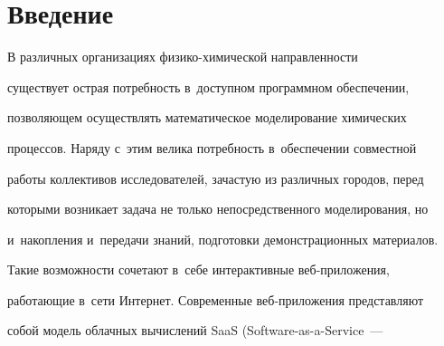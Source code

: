   























      \thispagestyle{headings}


      


      \vspace*{-18pt}





  \section{Введение}





  В различных организациях фи\-зи\-ко-хи\-ми\-че\-ской направленности 


существует острая потребность в~доступном программном обеспечении, 


позволяющем осуществлять математическое моделирование химических 


процессов. Наряду с~этим велика потребность в~обеспечении совместной 


работы коллективов исследователей, зачастую из различных городов, перед 


которыми возникает задача не только непосредственного моделирования, но 


и~накопления и~передачи знаний, подготовки демонстрационных материалов. 


Такие возможности сочетают в~себе интерактивные веб-при\-ло\-же\-ния, 


работающие в~сети Интернет. Современные веб-при\-ло\-же\-ния представляют 


собой модель облачных вычислений SaaS (Software-as-a-Service~--- 


